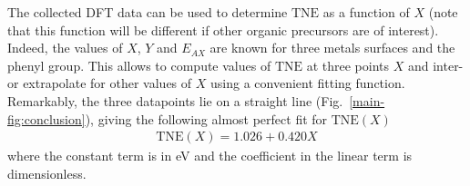 \documentclass[aps,prl,reprint,amsmath,amssymb,floatfix,notitlepage]{revtex4-1}
\begin{document}
The collected DFT data can be used to determine $\text{TNE}$ as a function of $X$ (note that this function will be different if other organic precursors are of interest). Indeed, the values of $X$, $Y$ and $E_{AX}$ are known for three metals surfaces and the phenyl group. This allows to compute values of $\text{TNE}$ at three points $X$ and inter- or extrapolate for other values of $X$ using a convenient fitting function. Remarkably, the three datapoints lie on a straight line (Fig.~\ref{main-fig:conclusion}), giving the following almost perfect fit for $\text{TNE}(X)$
%
\begin{equation} \label{eq:TNEfit}
\begin{split}
\text{TNE}(X) = 1.026 + 0.420 X
\end{split}
\end{equation}
%
where the constant term is in \si{\electronvolt} and the coefficient in the linear term is dimensionless. 


\end{document}
